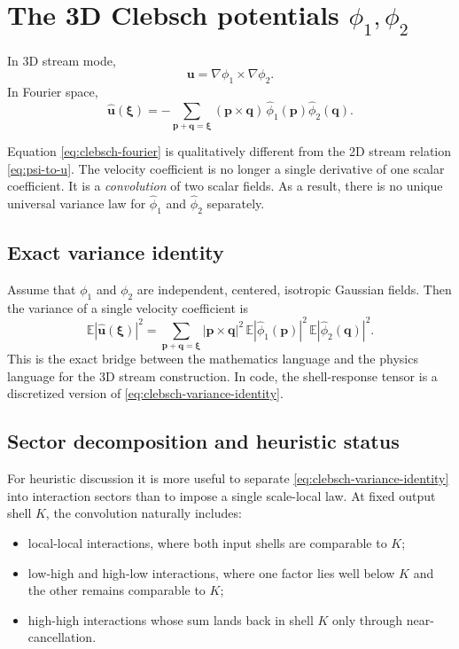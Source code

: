 \documentclass[11pt]{article}
\newcommand{\E}{\mathbb{E}}
\newcommand{\pp}{\mathbf{p}}
\newcommand{\qq}{\mathbf{q}}
\newcommand{\xii}{\boldsymbol{\xi}}
\newcommand{\uu}{\mathbf{u}}
\begin{document}
\section{The 3D Clebsch potentials \texorpdfstring{$\phi_1,\phi_2$}{phi1, phi2}}
In 3D stream mode,
\begin{equation}
\uu = \nabla\phi_1\times \nabla\phi_2.
\label{eq:clebsch-definition}
\end{equation}
In Fourier space,
\begin{equation}
\hat{\uu}(\xii)=
-\sum_{\pp+\qq=\xii}
(\pp\times \qq)\,\hat{\phi}_1(\pp)\hat{\phi}_2(\qq).
\label{eq:clebsch-fourier}
\end{equation}

Equation \eqref{eq:clebsch-fourier} is qualitatively different from the 2D stream relation \eqref{eq:psi-to-u}. The velocity coefficient is no longer a single derivative of one scalar coefficient. It is a \emph{convolution} of two scalar fields. As a result, there is no unique universal variance law for $\hat{\phi}_1$ and $\hat{\phi}_2$ separately.

\subsection{Exact variance identity}
Assume that $\phi_1$ and $\phi_2$ are independent, centered, isotropic Gaussian fields. Then the variance of a single velocity coefficient is
\begin{equation}
\E |\hat{\uu}(\xii)|^2
=
\sum_{\pp+\qq=\xii}
|\pp\times\qq|^2\,
\E |\hat{\phi}_1(\pp)|^2\,
\E |\hat{\phi}_2(\qq)|^2.
\label{eq:clebsch-variance-identity}
\end{equation}
This is the exact bridge between the mathematics language and the physics language for the 3D stream construction. In code, the shell-response tensor is a discretized version of \eqref{eq:clebsch-variance-identity}.

\subsection{Sector decomposition and heuristic status}
For heuristic discussion it is more useful to separate \eqref{eq:clebsch-variance-identity} into interaction sectors than to impose a single scale-local law. At fixed output shell $K$, the convolution naturally includes:
\begin{itemize}
\item local-local interactions, where both input shells are comparable to $K$;
\item low-high and high-low interactions, where one factor lies well below $K$ and the other remains comparable to $K$;
\item high-high interactions whose sum lands back in shell $K$ only through near-cancellation.
\end{itemize}
\end{document}
